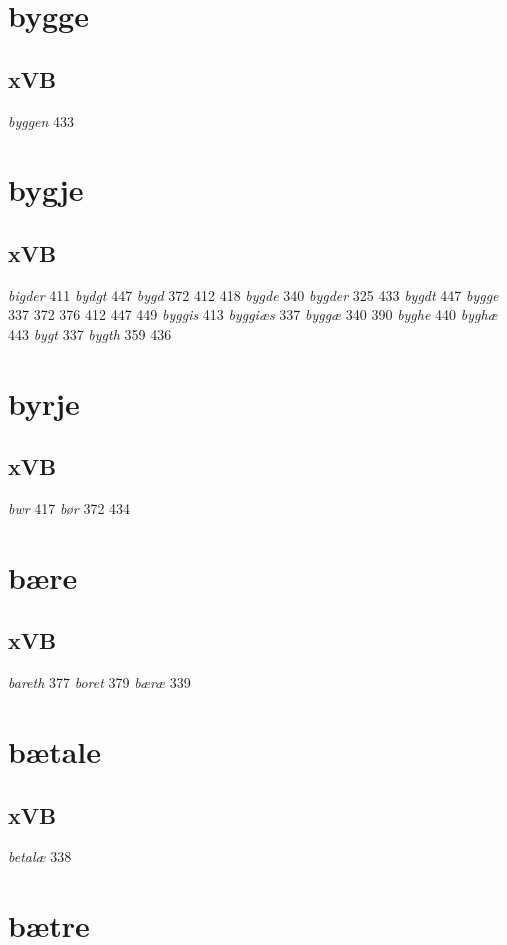 \documentclass[a4paper,twocolumn]{article}
\begin{document}
\section{bygge}
\label{sec:org1a7b9e1}
\subsection{xVB}
\label{sec:orga27cad0}
\emph{byggen} 433 
\section{bygje}
\label{sec:org64e9f8d}
\subsection{xVB}
\label{sec:org70f1d3c}
\emph{bigder} 411 \emph{bydgt} 447 \emph{bygd} 372 412 418 \emph{bygde} 340 \emph{bygder} 325 433 \emph{bygdt} 447 \emph{bygge} 337 372 376 412 447 449 \emph{byggis} 413 \emph{byggiæs} 337 \emph{byggæ} 340 390 \emph{byghe} 440 \emph{byghæ} 443 \emph{bygt} 337 \emph{bygth} 359 436 
\section{byrje}
\label{sec:orgb741c67}
\subsection{xVB}
\label{sec:orge289810}
\emph{bwr} 417 \emph{bør} 372 434 
\section{bære}
\label{sec:org6120307}
\subsection{xVB}
\label{sec:orgff6b364}
\emph{bareth} 377 \emph{boret} 379 \emph{bæræ} 339 
\section{bætale}
\label{sec:org598b3ae}
\subsection{xVB}
\label{sec:orgb2783f1}
\emph{betalæ} 338 
\section{bætre}
\label{sec:org3e22ab8}
\end{document}
